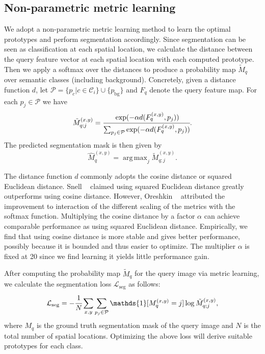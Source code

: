 \documentclass[10pt,twocolumn,letterpaper]{article}
\DeclareMathOperator*{\argmax}{arg\,max}
\begin{document}
\subsection{Non-parametric metric learning}\label{dist}
We adopt a non-parametric metric learning method to learn the optimal prototypes and perform segmentation accordingly. Since segmentation can be seen as classification at each spatial location, we calculate the distance between the query feature vector at each spatial location with each computed prototype. Then we apply a softmax over the distances to produce a probability map $\tilde{M}_{q}$ over semantic classes (including background). Concretely, given a distance function $d$, let $\mathcal{P}=\{p_c|c\in\mathcal{C}_i\}\cup\{p_{\text{bg}}\}$ and $F_{q}$ denote the query feature map. For each $p_j\in\mathcal{P}$ we have
\begin{equation}
\label{eqn:prob_map}
    \tilde{M}_{q;j}^{(x,y)} = \cfrac{\exp(-\alpha d(F_{q}^{(x, y)}, p_j))}{\sum_{p_j\in\mathcal{P}}\exp(-\alpha d(F_{q}^{(x, y)}, p_j))}.
\end{equation}
The predicted segmentation mask is then given by
\begin{equation}
\label{eqn:seg_mask}
    \hat{M}_{q}^{(x,y)} = \argmax_j \tilde{M}_{q;j}^{(x,y)}.
\end{equation}

 The distance function $d$ commonly adopts the cosine distance or squared Euclidean distance. Snell \etal~\cite{snell2017prototypical} claimed using squared Euclidean distance greatly outperforms using cosine distance. However, Oreshkin \etal~\cite{oreshkin2018tadam} attributed the improvement to interaction of the different scaling of the metrics with the softmax function. Multiplying the cosine distance by a factor $\alpha$ can achieve comparable performance as using squared Euclidean distance. Empirically, we find that using cosine distance is more stable and gives better performance, possibly because it is bounded and thus easier to optimize. The multiplier $\alpha$ is fixed at 20 since we find learning it yields little performance gain.

After computing the probability map $\tilde{M}_{q}$ for the query image via metric learning, we calculate the segmentation loss $\mathcal{L}_{\text{seg}}$  as follows:
\begin{equation}
\label{eqn: loss_seg}
    \mathcal{L}_{\text{seg}} = -\cfrac{1}{N}\sum_{x,y}\sum_{p_j\in\mathcal{P}}\mathds{1}[M_{q}^{(x,y)}=j]\log  \tilde{M}_{q;j}^{(x,y)},
\end{equation}
where $M_{q}$ is the ground truth segmentation mask of the query image and $N$ is the total number of spatial locations. Optimizing the above loss will derive suitable prototypes for each class.
\end{document}
